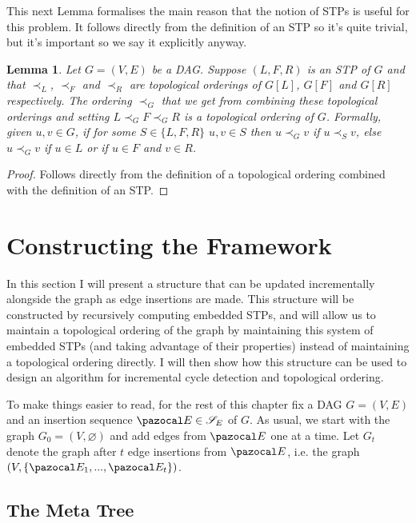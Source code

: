 \documentclass{report}
\newtheorem{lemma}[theorem]{Lemma}
\begin{document}
This next Lemma formalises the main reason that the notion of STPs is useful for this problem. It follows directly from the definition of an STP so it's quite trivial, but it's important so we say it explicitly anyway.

\begin{lemma}
Let $G=(V,E)$ be a DAG. Suppose $(L,F,R)$ is an STP of $G$ and that $\prec_{L}$, $\prec_{F}$ and $\prec_{R}$ are topological orderings of $G[L]$, $G[F]$ and $G[R]$ respectively. The ordering $\prec_{G}$ that we get from combining these topological orderings and setting $L \prec_{G} F \prec_{G} R$ is a topological ordering of $G$. Formally, given $u, v \in G$, if for some $S \in \{ L,F,R\}$ $u,v \in S$ then $u \prec_{G} v$ if $u \prec_{S} v$, else $u \prec_{G} v$ if $u \in L$ or if $u \in F$ and $v \in R$. 
\end{lemma}

\begin{proof}
Follows directly from the definition of a topological ordering combined with the definition of an STP.
\end{proof}

\section{Constructing the Framework}

In this section I will present a structure that can be updated incrementally alongside the graph as edge insertions are made. This structure will be constructed by recursively computing embedded STPs, and will allow us to maintain a topological ordering of the graph by maintaining this system of embedded STPs (and taking advantage of their properties) instead of maintaining a topological ordering directly. I will then show how this structure can be used to design an algorithm for incremental cycle detection and topological ordering. 

To make things easier to read, for the rest of this chapter fix a DAG $G=(V,E)$ and an insertion sequence $\pazocal E \in \mathcal S_E$ of $G$. As usual, we start with the graph $G_{0}=(V,\varnothing)$ and add edges from $\pazocal E$ one at a time. Let $G_{t}$ denote the graph after $t$ edge insertions from $\pazocal E$, i.e. the graph $(V,\{\pazocal E_{1},...,\pazocal E_{t}\})$.

\subsection{The Meta Tree}
\end{document}
